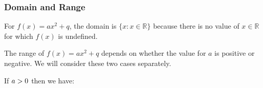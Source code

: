            \subsubsection{ Domain and Range}
            \nopagebreak
          \label{m39345*id242046}For $f\left(x\right)=a{x}^{2}+q$, the domain is $\{x:x\in \mathbb{R}\}$ because there is no value of $x\in \mathbb{R}$ for which $f\left(x\right)$ is undefined.\par 
          \label{m39345*id242145}The range of $f\left(x\right)=a{x}^{2}+q$ depends on whether the value for $a$ is positive or negative. We will consider these two cases separately.\par 
          \label{m39345*id242193}If $a>{}0$ then we have:\par 
          \label{m39345*id242213}\nopagebreak\noindent{}
